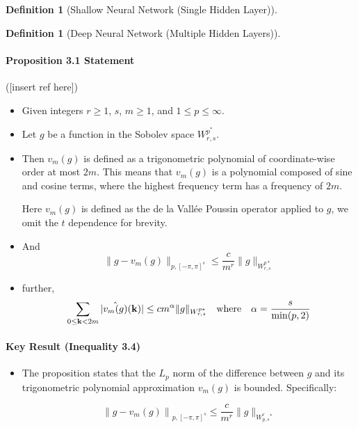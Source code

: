 \documentclass[11pt,a4paper]{article}
\theoremstyle{plain}
\theoremstyle{definition}
\newtheorem{definition}[theorem]{Definition}
\theoremstyle{remark}
\begin{document}
\begin{definition}[Shallow Neural Network (Single Hidden Layer)]
\begin{definition}[Deep Neural Network (Multiple Hidden Layers)]
\paragraph[]{Proposition 3.1 Statement}

([insert ref here])

\begin{itemize}
    \item  Given integers \( r \geq 1 \), \( s \), \( m \geq 1 \), and \( 1 \leq p \leq \infty \).
    \item  Let \( g \) be a function in the Sobolev space \( W^{p^{\ast}}_{r,s} \).
    
    \item Then \( v_m(g) \) is defined as a trigonometric polynomial of coordinate-wise order at most \( 2m \). This means that \( v_m(g) \) is a polynomial composed of sine and cosine terms, where the highest frequency term has a frequency of \( 2m \).
    
    Here \( v_m(g) \) is defined as the de la Vallée Poussin operator applied to \( g \), we omit the \(t\) dependence for brevity.
    \item And 
    \setcounter{equation}{1} 
    \begin{equation}
        \|g - v_m(g)\|_{p, [-\pi, \pi]^s} \leq \frac{c}{m^r} \|g\|_{W^{p*}_{r,s}}
    \end{equation}
    \item further,
    \begin{equation}
        \sum_{0 \leq \mathbf{k} < 2m} |\Hat{v_m(g)}(\mathbf{k})| \leq cm^\alpha \|g\|_{W^{p*}_{r,s}}  \quad \text{where} \quad \alpha = \frac{s}{\min(p,2)} 
    \end{equation}
\end{itemize}

\paragraph*{Key Result (Inequality 3.4)}

\begin{itemize}
    \item  The proposition states that the \( L_p \) norm of the difference between \( g \) and its trigonometric polynomial approximation \( v_m(g) \) is bounded. Specifically:

    \setcounter{equation}{1} 
    \begin{equation}
        \left\|g - v_m(g)\right\|_{p, [-\pi,\pi]^s} \leq \frac{c}{m^r} \|g\|_{W^r_{p, s}^*}
    \end{equation}


\end{itemize}
\end{definition}
\end{definition}
\end{document}
